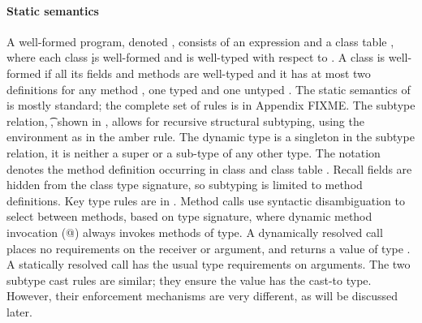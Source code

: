 \documentclass[runnningheads]{tex/llncs}
\begin{document}
\paragraph{Static semantics} A well-formed program, denoted \WFp\e\K, consists
of an expression \e and a class table \K, where each class \k is well-formed
and \e is well-typed with respect to \K.  A class is well-formed if all its
fields and methods are well-typed and it has at most two definitions for any
method \m, one typed \Mdef\m\x\C\D\e and one untyped \Mdef\m\x\any\any\e.  The
static semantics of \kafka is mostly standard; the complete set of rules is in
Appendix FIXME.  The subtype relation, \StrSub\M\K\t\tp, shown in
, allows for recursive structural subtyping, using the environment
\M as in the amber rule.  The dynamic type \any is a singleton in the subtype
relation, it is neither a super or a sub-type of any other type.  The notation
\md\In\App\K\C denotes the method definition \md occurring in class \C and
class table \K.  Recall fields are hidden from the class type signature, so
subtyping is limited to method definitions.  Key type rules are in
.  Method calls use syntactic disambiguation to select
between methods, based on type signature, where dynamic method invocation (@)
always invokes methods of type\any. A dynamically resolved call places no
requirements on the receiver or argument, and returns a value of type \any.  A
statically resolved call has the usual type requirements on arguments. The two
subtype cast rules are similar; they ensure the value has the cast-to type.
However, their enforcement mechanisms are very different, as will be discussed
later.
\end{document}
